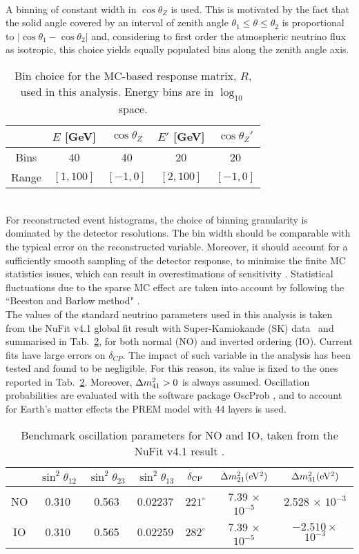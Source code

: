 \\
A binning of constant width in $\cos\theta_Z$ is used. This is motivated by the fact that the solid angle covered by an interval of zenith angle $\theta_1 \leq \theta \leq \theta_2$ is proportional to $|\cos\theta_1 - \cos\theta_2|$ and, considering to first order the atmospheric neutrino flux as isotropic, this choice yields equally populated bins along the zenith angle axis. 
\begin{table}[h]
	\centering
	\begin{tabular}{|c|c|c|c|c|}
		\hline
		& $E$ [GeV]& $\cos\theta_Z$ & $E'$ [GeV]& $\cos\theta_Z'$ \\
		\hline
		Bins & 40 & 40 &  20 & 20 \\
		\hline
		Range & $[1, 100]$ & $[-1, 0]$ & $[2, 100]$ & $[-1, 0]$ \\
		\hline
	\end{tabular}
	\caption{Bin choice for the MC-based response matrix, $R$, used in this analysis. Energy bins are in $\log_{10}$ space.}
	\label{tab:binsSwim}
\end{table}
\\
For reconstructed event histograms, the choice of binning granularity is dominated by the detector resolutions. The bin width should be comparable with the typical error on the reconstructed variable. Moreover, it should account for a sufficiently smooth sampling of the detector response, to minimise the finite MC statistics issues, which can result in overestimations of sensitivity \cite{swim}. Statistical fluctuations due to the sparse MC effect are taken into account by following the “Beeston and Barlow method" \cite{beeston}. 
\\
The values of the standard neutrino parameters used in this analysis is taken from the NuFit v4.1 global fit result with Super-Kamiokande (SK) data~\cite{NuFit41} and summarised in Tab.~\ref{tab:benchmarkoscparam}, for both normal (NO) and inverted ordering (IO). Current fits have large errors on $\delta_{CP}$. The impact of such variable in the analysis has been tested and found to be negligible. For this reason, its value is fixed to the ones reported in Tab.~\ref{tab:benchmarkoscparam}. Moreover, $\Delta m^2_{41} > 0$ is always assumed. Oscillation probabilities are evaluated with the software package OscProb \cite{OscProb}, and to account for Earth's matter effects the PREM model \cite{PREM} with 44 layers is used.
\begin{table}[h]
	\centering
	\begin{tabular}{|c|c|c|c|c|c|c|}
		\hline
		& $\sin^2 \theta_{12}$ & $\sin^2\theta_{23}$ & $\sin^2\theta_{13}$ & $\delta_{\textrm{CP}}$ & $\Delta m_{21}^2 (\rm eV^2)$ & $\Delta m_{31}^2 (\rm eV^2)$ \\
		\hline
		NO & 0.310 & 0.563 & 0.02237 & $221^\circ$ & 7.39 $\times$ $10^{-5}$ & 2.528 $\times$ $10^{-3}$ \\
		\hline
		IO & 0.310 & 0.565 & 0.02259 & $282^\circ$ & 7.39 $\times$ $10^{-5}$ & $-2.510 \times$ $10^{-3}$ \\
		\hline
	\end{tabular}
	\caption{Benchmark oscillation parameters for NO and IO, taken from the NuFit v4.1 result \cite{NuFit41}.}
	\label{tab:benchmarkoscparam}
\end{table}
